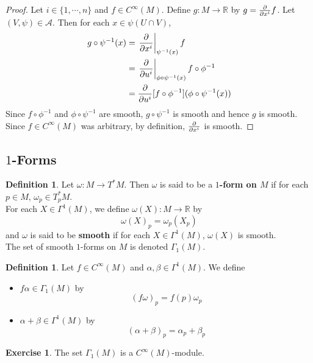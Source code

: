 \documentclass[12pt]{amsart}
\theoremstyle{definition}
\newtheorem{defn}[definition]{Definition}
\newtheorem{ex}[definition]{Exercise}
\newcommand{\al}{\alpha}
\newcommand{\Gam}{\Gamma}
\newcommand{\bet}{\beta}
\newcommand{\om}{\omega}
\newcommand{\R}{\mathbb{R}}
\newcommand{\MA}{\mathcal{A}}
\begin{document}
	\begin{proof}
	Let $i \in \{1, \cdots, n\}$ and $f \in C^{\infty}(M)$. Define $g: M \rightarrow \R$ by $g = \pdv{x^i} f$. Let $(V, \psi) \in \MA$. Then for each $x \in \psi(U \cap V)$, 
	\begin{align*}
	g \circ \psi^{-1}(x) 
	&= \eval{\pdv{x^i}}_{\psi^{-1}(x)}f \\
	&= \eval{\pdv{u^i}}_{\phi \circ \psi^{-1}(x)}f \circ \phi^{-1}  \\
	&= \pdv{u^i}[f \circ \phi^{-1}] ( \phi \circ \psi^{-1} (x))\\
\end{align*}	 
	Since $f \circ \phi^{-1}$ and $\phi \circ \psi^{-1}$ are smooth, $g \circ \psi^{-1}$ is smooth and hence $g$ is smooth. Since $f \in C^{\infty}(M)$ was arbitrary, by definition, $\pdv{x^i}$ is smooth. 
	\end{proof}
	
	
	
	
	
	
	
	\newpage
	\subsection{$1$-Forms}
	
	\begin{defn}
		Let $\om: M \rightarrow T^*M$. Then $\om$ is said to be a \textbf{$1$-form on $M$} if for each $p \in M$, $\om_p \in T^*_p M$. \\
		For each $X \in \Gam^1(M)$, we define $\om(X) : M \rightarrow \R$ by $$\om(X)_p = \om_p(X_p)$$
		and $\om$ is said to be \textbf{smooth} if for each $X \in \Gam^1(M)$, $\om(X)$ is smooth. \\
		The set of smooth $1$-forms on $M$ is denoted $\Gam_1(M)$.\\
	\end{defn}

	\begin{defn}
	Let $f \in C^{\infty}(M)$ and $\al,\bet \in \Gam^1(M)$. We define 
	\begin{itemize}
	\item $f\al \in \Gam_1(M)$ by $$(f\om)_p = f(p)\om_p$$
	\item $\al+\bet \in \Gam^1(M)$ by $$(\al+\bet)_p = \al_p+\bet_p$$
	\end{itemize}
	\end{defn}
	
	\begin{ex}
	The set $\Gam_1(M)$ is a $C^{\infty}(M)$-module.
	\end{ex}
	
\end{document}
